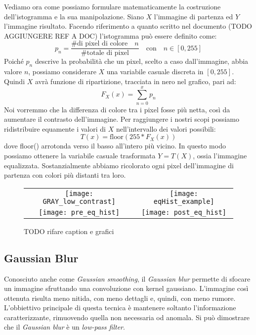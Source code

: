 Vediamo ora come possiamo formulare matematicamente la costruzione dell'istogramma e la sua manipolazione.
Siano $X$ l'immagine di partenza ed $Y$ l'immagine risultato.
Facendo riferimento a quanto scritto nel documento (TODO AGGIUNGERE REF A DOC) l'istogramma può essere definito come:
\begin{equation*}
p_n = \frac{\text{\# di pixel di colore} \quad n}{\text{\# totale di pixel}} \quad \text{con} \quad n \in [0,255]
\end{equation*}
Poiché $p_n$ descrive la probabilità che un pixel, scelto a caso dall'immagine, abbia valore $n$, possiamo considerare $X$ una variabile casuale discreta in $[0,255]$.
Quindi $X$ avrà funzione di ripartizione, tracciata in nero nel grafico, pari ad:
\begin{equation*}
  F_X(x) = \sum_{n=0}^{x} p_n
\end{equation*}
Noi vorremmo che la differenza di colore tra i pixel fosse più netta, così da aumentare il contrasto dell'immagine.
Per raggiungere i nostri scopi possiamo ridistribuire equamente i valori di $X$ nell'intervallo dei valori possibili:
\begin{equation*}
  T(x) = \text{floor}(255 * F_X(x))
\end{equation*}
dove floor() arrotonda verso il basso all'intero più vicino.
In questo modo possiamo ottenere la variabile casuale trasformata $Y=T(X)$, ossia l'immagine equalizzata.
Sostanzialmente abbiamo ricolorato ogni pixel dell'immagine di partenza con colori più distanti tra loro.

\begin{figure}[ht] %
  \begin{center}
    \begin{tabular}{cc}
      \texttt{[image: GRAY\_low\_contrast]} &
      \texttt{[image: eqHist\_example]} \\
      \texttt{[image: pre\_eq\_hist]} &
      \texttt{[image: post\_eq\_hist]}
    \end{tabular}
    \caption{TODO rifare caption e grafici}
    \label{fig:hist_eq_example}
  \end{center}
\end{figure}



\clearpage
\subsection {Gaussian Blur}
Conosciuto anche come \textit{Gaussian smoothing}, il \textit{Gaussian blur} permette di sfocare un immagine sfruttando una convoluzione con kernel gaussiano.
L'immagine così ottenuta risulta meno nitida, con meno dettagli e, quindi, con meno rumore.
L'obbiettivo principale di questa tecnica è mantenere soltanto l'informazione caratterizzante, rimuovendo quella non necessaria od anomala.
Si può dimostrare che il \textit{Gaussian blur} è un \textit{low-pass filter}.


